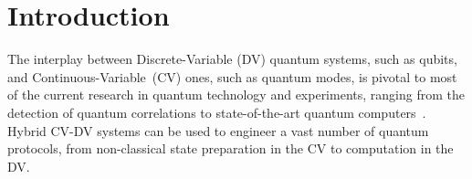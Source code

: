 \documentclass[%
reprint,
superscriptaddress,
nofootinbib,
 amsmath,amssymb,
prx,
floatfix,
]{revtex4-2}
\begin{document}
\begin{abstract}
\hspace{0.5cm}


\end{abstract}

\maketitle




\section{Introduction \label{sec:intro}}


The interplay between Discrete-Variable (DV) quantum systems, such as qubits, and Continuous-Variable~(CV) ones, such as quantum modes, is pivotal to most of the current research in quantum technology and experiments, ranging from the detection of quantum correlations to state-of-the-art quantum computers~\cite{hensen_loophole_2015,Reglade_quantum_2024}. Hybrid CV-DV systems can be used to engineer a vast number of quantum protocols, from non-classical state preparation in the CV to computation in the DV.
\end{document}

